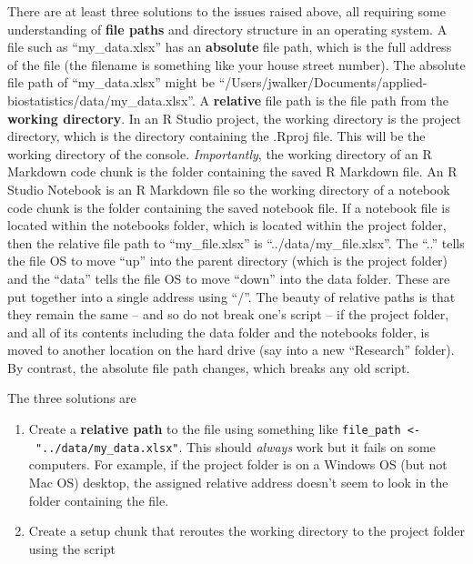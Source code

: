 \documentclass[]{book}
\providecommand{\tightlist}{%
  \setlength{\itemsep}{0pt}\setlength{\parskip}{0pt}}
\begin{document}
There are at least three solutions to the issues raised above, all
requiring some understanding of \textbf{file paths} and directory
structure in an operating system. A file such as ``my\_data.xlsx'' has
an \textbf{absolute} file path, which is the full address of the file
(the filename is something like your house street number). The absolute
file path of ``my\_data.xlsx'' might be
``/Users/jwalker/Documents/applied-biostatistics/data/my\_data.xlsx''. A
\textbf{relative} file path is the file path from the \textbf{working
directory}. In an R Studio project, the working directory is the project
directory, which is the directory containing the .Rproj file. This will
be the working directory of the console. \emph{Importantly}, the working
directory of an R Markdown code chunk is the folder containing the saved
R Markdown file. An R Studio Notebook is an R Markdown file so the
working directory of a notebook code chunk is the folder containing the
saved notebook file. If a notebook file is located within the notebooks
folder, which is located within the project folder, then the relative
file path to ``my\_file.xlsx'' is ``../data/my\_file.xlsx''. The ``..''
tells the file OS to move ``up'' into the parent directory (which is the
project folder) and the ``data'' tells the file OS to move ``down'' into
the data folder. These are put together into a single address using
``/''. The beauty of relative paths is that they remain the same -- and
so do not break one's script -- if the project folder, and all of its
contents including the data folder and the notebooks folder, is moved to
another location on the hard drive (say into a new ``Research'' folder).
By contrast, the absolute file path changes, which breaks any old
script.

The three solutions are

\begin{enumerate}
\def\labelenumi{\arabic{enumi}.}
\tightlist
\item
  Create a \textbf{relative path} to the file using something like
  \texttt{file\_path\ \textless{}-\ "../data/my\_data.xlsx"}. This
  should \emph{always} work but it fails on some computers. For example,
  if the project folder is on a Windows OS (but not Mac OS) desktop, the
  assigned relative address doesn't seem to look in the folder
  containing the file.
\item
  Create a setup chunk that reroutes the working directory to the
  project folder using the script
\end{enumerate}
\end{document}
